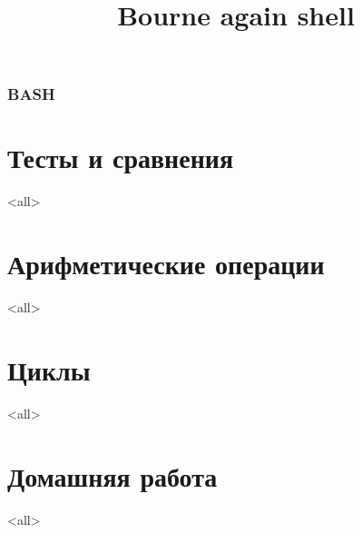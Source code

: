 
\title[bash]{Bourne again shell}




\begin{frame}
	\frametitle{BASH}
	\titlepage
	\vspace{-0.5cm}
	\begin{center}
	\end{center}
\end{frame}

\begin{frame}
	\tableofcontents
\end{frame}




\section{Тесты и сравнения}

\mode<all>{}


\section{Арифметические операции}

\mode<all>{}

\section{Циклы}

\mode<all>{}

\section{Домашняя работа}
\mode<all>{}




